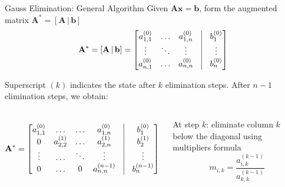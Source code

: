 \documentclass[aspectratio=169]{beamer}
\begin{document}
\begin{frame}{Gauss Elimination: General Algorithm}
	\small{Given $\mathbf{A}\mathbf{x} = \mathbf{b}$, form the \alert{augmented matrix} $\mathbf{A}^{*} = [\mathbf{A} \, | \, \mathbf{b}]$}
	\vspace{0.15cm}
	\begin{equation*}
		\mathbf{A}^{*} = [\mathbf{A} \, | \, \mathbf{b}] =
		\begin{bmatrix}
			a_{1,1}^{(0)} & \ldots & a_{1,n}^{(0)} & \vline & b_{1}^{(0)} \\
			\vdots        & \ddots & \vdots        & \vline & \vdots      \\
			a_{n,1}^{(0)} & \ldots & a_{n,n}^{(0)} & \vline & b_{n}^{(0)}
		\end{bmatrix}
	\end{equation*}

	\vspace{0.15cm}
	\small{Superscript $(k)$ indicates the state after $k$ elimination steps. After $n-1$ elimination steps, we obtain:}
	\vspace{0.15cm}

	\begin{columns}
		\begin{equation*}
			\mathbf{A}^{*} =
			\begin{bmatrix}
				a_{1,1}^{(0)} & \ldots        & \ldots & a_{1,n}^{(0)}   & \vline & b_{1}^{(0)}   \\
				0             & a_{2,2}^{(1)} & \ldots & a_{2,n}^{(1)}   & \vline & b_{2}^{(1)}   \\
				\vdots        & \ldots        & \ddots & \vdots          & \vline & \vdots        \\
				0             & \ldots        & 0      & a_{n,n}^{(n-1)} & \vline & b_{n}^{(n-1)}
			\end{bmatrix}
		\end{equation*}

		\small{
			At step $k$: eliminate column $k$ below the diagonal using multipliers formula
			\begin{equation*}
				m_{i,k} = \frac{a_{i,k}^{(k-1)}}{a_{k,k}^{(k-1)}}
			\end{equation*}
		}
	\end{columns}
\end{frame}
\end{document}
